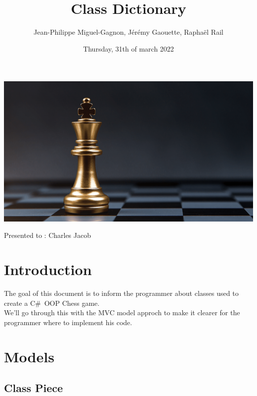 \documentclass[12pt]{article}
\title{Class Dictionary}
\author{Jean-Philippe Miguel-Gagnon, Jérémy Gaouette, Raphaël Rail}
\date{Thursday, 31th of march 2022}
\begin{document}
\begin{titlepage}
\maketitle
\includegraphics[width=\textwidth]{CHESS}
\begin{center}Presented to : Charles Jacob\end{center}
\end{titlepage}

\tableofcontents

\newpage

\section{Introduction}

The goal of this document is to inform the programmer about
classes used to create a C\#\ OOP Chess game.
\\

We'll go through this with the MVC model approch to make it
clearer for the programmer where to implement his code. 

\newpage

\section{Models}

\subsection{Class Piece}
\end{document}
